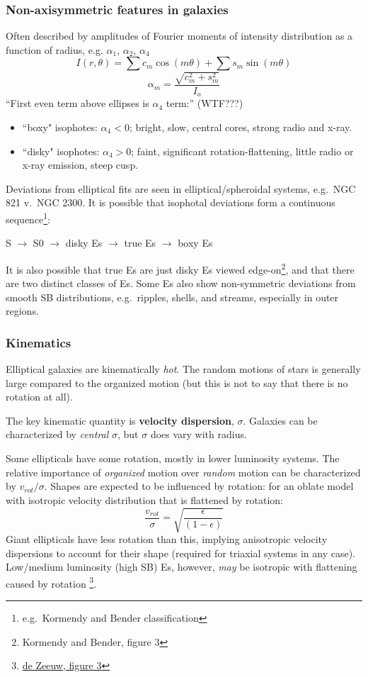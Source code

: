 \documentclass{article}
\newcommand{\mynotes}[1]{\textcolor{cadmiumgreen}{#1}}
\begin{document}
\subsubsection{Non-axisymmetric features in galaxies}
Often described by amplitudes of Fourier moments of
intensity distribution as a function of radius, e.g.
$\alpha_{1}$, $\alpha_{2}$, $\alpha_{4}$
\[
    I\left(r,\theta\right) = \sum{c_{m}\cos\left(m\theta\right)} +
    \sum{s_{m}\sin\left(m\theta\right)}
    \]
\[
    \alpha_{m} = \frac{\sqrt{c^{2}_{m} + s_{m}^{2}}}{I_{o}}
    \]
``First even term above ellipses is $\alpha_{4}$ term:'' \mynotes{(WTF???)}
\begin{itemize}
    \item ``boxy" isophotes: $\alpha_{4} < 0$;
        bright, slow, central cores, strong radio and x-ray.
    \item ``disky" isophotes: $\alpha_{4} > 0$;
        faint, significant rotation-flattening, little
        radio or x-ray emission, steep cusp.
\end{itemize}
Deviations from elliptical fits are seen in elliptical/spheroidal systems,
e.g.\ NGC 821 v.\ NGC 2300. It is possible that isophotal deviations form
a continuous sequence\footnote{e.g.\ Kormendy and Bender classification}:
\begin{center}
    S $\rightarrow$ S0 $\rightarrow$ disky Es $\rightarrow$
    true Es $\rightarrow$ boxy Es
\end{center}
It is also possible that true Es are just disky Es viewed
edge-on\footnote{Kormendy and Bender, figure 3}, and that there are two
distinct classes of Es. Some Es also show non-symmetric deviations from
smooth SB distributions, e.g.\ ripples, shells, and streams, especially
in outer regions.

\subsubsection{Kinematics}
Elliptical galaxies are kinematically \emph{hot}. The random motions of stars
is generally large compared to the organized motion (but this is not to say
that there is no rotation at all).

The key kinematic quantity is \textbf{velocity dispersion}, $\sigma$.
Galaxies can be characterized by \emph{central} $\sigma$, but $\sigma$ does
vary with radius.

Some ellipticals have some rotation, mostly in lower luminosity systems.
The relative importance of \emph{organized} motion over \emph{random} motion
can be characterized by $v_{rot}/\sigma$. Shapes are expected to be influenced
by rotation: for an oblate model with isotropic velocity distribution that is
flattened by rotation:
\[
    \frac{v_{rot}}{\sigma} = \sqrt{\frac{\epsilon}{\left(1-\epsilon\right)}}
    \]
Giant ellipticals have less rotation than this, implying anisotropic velocity
dispersions to account for their shape (required for triaxial systems in any
case). Low/medium luminosity (high SB) Es, however, \emph{may} be isotropic
with flattening caused by rotation
\footnote{
    \href{}
    {de Zeeuw, figure 3}
}.
\end{document}

